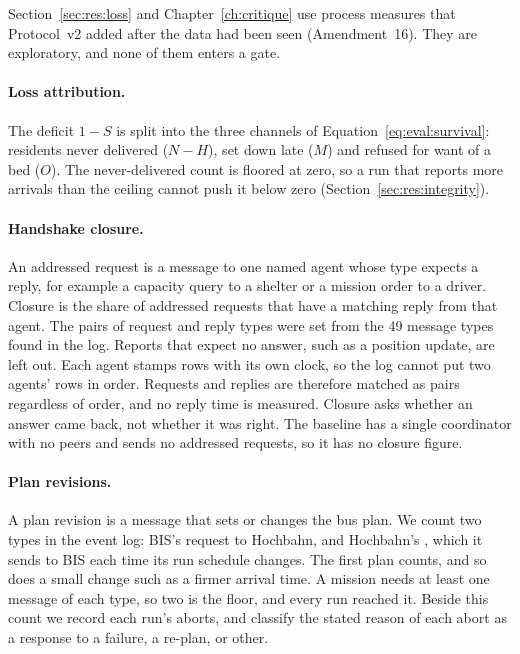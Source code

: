 Section~\ref{sec:res:loss} and Chapter~\ref{ch:critique} use process measures
that Protocol~v2 added after the data had been seen (Amendment~16). They are
exploratory, and none of them enters a gate.

\paragraph{Loss attribution.} The deficit $1 - S$ is split into the three
channels of Equation~\ref{eq:eval:survival}: residents never delivered
($N - H$), set down late ($M$) and refused for want of a bed ($O$). The
never-delivered count is floored at zero, so a run that reports more arrivals
than the ceiling cannot push it below zero (Section~\ref{sec:res:integrity}).

\paragraph{Handshake closure.} An addressed request is a message to one named
agent whose type expects a reply, for example a capacity query to a shelter or a
mission order to a driver. Closure is the share of addressed requests that have a matching
reply from that agent. The pairs of request and reply types were set from the
49 message types found in the log. Reports that expect no answer, such as a
position update, are left out. Each agent stamps rows with its own clock, so the
log cannot put two agents' rows in order. Requests and replies are therefore
matched as pairs regardless of order, and no reply time is measured. Closure
asks whether an answer came back, not whether it was right. The baseline has a
single coordinator with no peers and sends no addressed requests, so it has no
closure figure.

\paragraph{Plan revisions.} A plan revision is a message that sets or changes
the bus plan. We count two types in the event log: BIS's 
request to Hochbahn, and Hochbahn's , which it sends to
BIS each time its run schedule changes. The first plan counts, and so does a
small change such as a firmer arrival time. A mission needs at least one
message of each type, so two is the floor, and every run reached it. Beside
this count we record each run's aborts, and classify the stated reason of each
abort as a response to a failure, a re-plan, or other.

